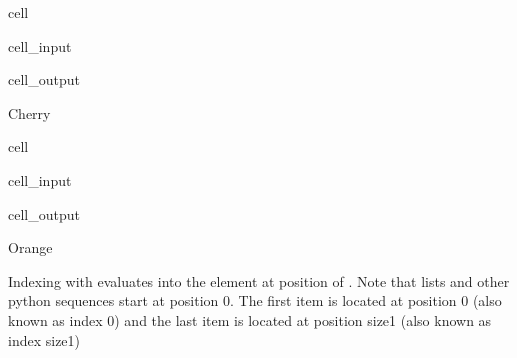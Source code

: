 \documentclass[letterpaper,10pt,english]{jupyterBook}
\begin{document}
\begin{sphinxuseclass}{cell}\begin{sphinxVerbatimInput}

\begin{sphinxuseclass}{cell_input}
\begin{sphinxVerbatim}[commandchars=\\\{\}]
  
\PYG{p}{[}\PYG{p}{]}
\end{sphinxVerbatim}

\end{sphinxuseclass}\end{sphinxVerbatimInput}
\begin{sphinxVerbatimOutput}

\begin{sphinxuseclass}{cell_output}
\begin{sphinxVerbatim}[commandchars=\\\{\}]
\PYGZsq{}Cherry\PYGZsq{}
\end{sphinxVerbatim}

\end{sphinxuseclass}\end{sphinxVerbatimOutput}

\end{sphinxuseclass}
\begin{sphinxuseclass}{cell}\begin{sphinxVerbatimInput}

\begin{sphinxuseclass}{cell_input}
\begin{sphinxVerbatim}[commandchars=\\\{\}]
\PYG{p}{[}\PYG{p}{]}
\end{sphinxVerbatim}

\end{sphinxuseclass}\end{sphinxVerbatimInput}
\begin{sphinxVerbatimOutput}

\begin{sphinxuseclass}{cell_output}
\begin{sphinxVerbatim}[commandchars=\\\{\}]
\PYGZsq{}Orange\PYGZsq{}
\end{sphinxVerbatim}

\end{sphinxuseclass}\end{sphinxVerbatimOutput}

\end{sphinxuseclass}
\sphinxAtStartPar
Indexing with  evaluates into the element at position  of . Note that lists and other python sequences start at position 0. The first item is located at position 0 (also known as index 0) and the last item is located at position size\sphinxhyphen{}1 (also known as index size\sphinxhyphen{}1)
\end{document}
